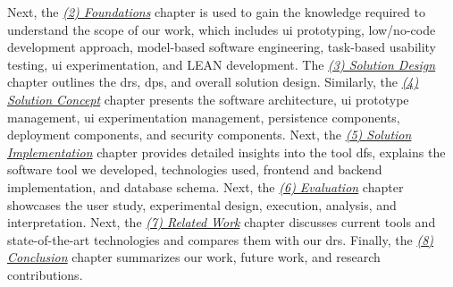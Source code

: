 Next, the \textit{\hyperref[chap:foundations]{(2) Foundations}} chapter is used to gain the knowledge required to understand the scope of our work, which includes \ac{ui} prototyping, low/no-code development approach, model-based software engineering, task-based usability testing, \ac{ui} experimentation, and LEAN development.
The \textit{\hyperref[chap:design]{(3) Solution Design}} chapter outlines the \ac{dr}s, \ac{dp}s, and overall solution design. 
Similarly, the \textit{\hyperref[chap:concept]{(4) Solution Concept}} chapter presents the software architecture, \ac{ui} prototype management, \ac{ui} experimentation management, persistence components, deployment components, and security components.
Next, the \textit{\hyperref[chap:implementation]{(5) Solution Implementation}} chapter provides detailed insights into the tool \ac{df}s, explains the software tool we developed, technologies used, frontend and backend implementation, and database schema. 
Next, the \textit{\hyperref[chap:evaluation]{(6) Evaluation}} chapter showcases the user study, experimental design, execution, analysis, and interpretation. 
Next, the \textit{\hyperref[chap:relatedWork]{(7) Related Work}} chapter discusses current tools and state-of-the-art technologies and compares them with our \ac{dr}s.
Finally, the \textit{\hyperref[chap:conclusion]{(8) Conclusion}} chapter summarizes our work, future work, and research contributions.
